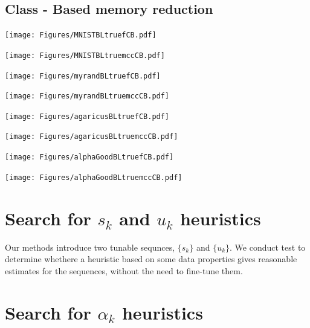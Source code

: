 \documentclass[11pt]{article}
\begin{document}
\subsection{Class - Based memory reduction}

\texttt{[image: Figures/MNISTBLtruefCB.pdf]}

\texttt{[image: Figures/MNISTBLtruemccCB.pdf]}

\texttt{[image: Figures/myrandBLtruefCB.pdf]}

\texttt{[image: Figures/myrandBLtruemccCB.pdf]}

\texttt{[image: Figures/agaricusBLtruefCB.pdf]}

\texttt{[image: Figures/agaricusBLtruemccCB.pdf]}

\texttt{[image: Figures/alphaGoodBLtruefCB.pdf]}

\texttt{[image: Figures/alphaGoodBLtruemccCB.pdf]}


\newpage \small 




\newpage
\appendices 
\section{Search for $s_k$ and $u_k$ heuristics}
\label{appendix:heuristics}

Our methods introduce two tunable sequnces, $\{s_k\}$ and $\{u_k\}$. We conduct test to determine whethere a heuristic based on some data properties gives reasonable estimates for the sequences, without the need to fine-tune them. 

\section{Search for $\alpha_k$ heuristics}
\label{appendix:heuristics}
\end{document}
